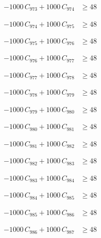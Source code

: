\documentclass[a4paper,11pt]{article}
\begin{document}
\begin{align}
-1000\,C_{973} + 1000\,C_{974} &\geq 48 \nonumber
\end{align}

\begin{align}
-1000\,C_{974} + 1000\,C_{975} &\geq 48 \nonumber
\end{align}

\begin{align}
-1000\,C_{975} + 1000\,C_{976} &\geq 48 \nonumber
\end{align}

\begin{align}
-1000\,C_{976} + 1000\,C_{977} &\geq 48 \nonumber
\end{align}

\begin{align}
-1000\,C_{977} + 1000\,C_{978} &\geq 48 \nonumber
\end{align}

\begin{align}
-1000\,C_{978} + 1000\,C_{979} &\geq 48 \nonumber
\end{align}

\begin{align}
-1000\,C_{979} + 1000\,C_{980} &\geq 48 \nonumber
\end{align}

\begin{align}
-1000\,C_{980} + 1000\,C_{981} &\geq 48 \nonumber
\end{align}

\begin{align}
-1000\,C_{981} + 1000\,C_{982} &\geq 48 \nonumber
\end{align}

\begin{align}
-1000\,C_{982} + 1000\,C_{983} &\geq 48 \nonumber
\end{align}

\begin{align}
-1000\,C_{983} + 1000\,C_{984} &\geq 48 \nonumber
\end{align}

\begin{align}
-1000\,C_{984} + 1000\,C_{985} &\geq 48 \nonumber
\end{align}

\begin{align}
-1000\,C_{985} + 1000\,C_{986} &\geq 48 \nonumber
\end{align}

\begin{align}
-1000\,C_{986} + 1000\,C_{987} &\geq 48 \nonumber
\end{align}
\end{document}
